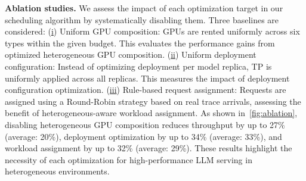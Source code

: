 
\textbf{Ablation studies.} We assess the impact of each optimization target in our scheduling algorithm by systematically disabling them. Three baselines are considered:
(\underline{i}) Uniform GPU composition: GPUs are rented uniformly across six types within the given budget. This evaluates the performance gains from optimized heterogeneous GPU composition.
(\underline{ii}) Uniform deployment configuration: Instead of optimizing deployment per model replica, TP is uniformly applied across all replicas. This measures the impact of deployment configuration optimization.
(\underline{iii}) Rule-based request assignment: Requests are assigned using a Round-Robin strategy based on real trace arrivals, assessing the benefit of heterogeneous-aware workload assignment.
As shown in~\autoref{fig:ablation}, disabling heterogeneous GPU composition reduces throughput by up to 27\% (average: 20\%), deployment optimization by up to 34\% (average: 33\%), and workload assignment by up to 32\% (average: 29\%). These results highlight the necessity of each optimization for high-performance LLM serving in heterogeneous environments.

